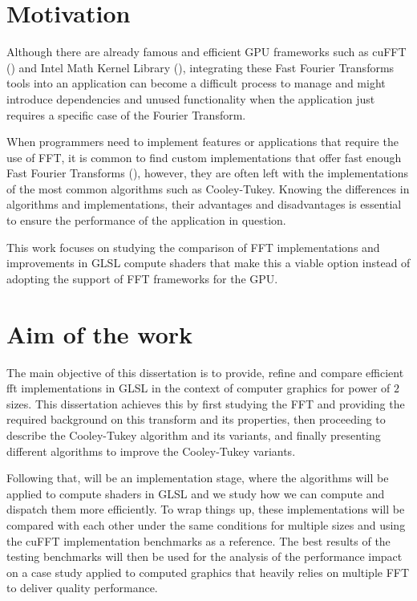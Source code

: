 \documentclass[
  oneside,
  11pt, a4paper,
  footinclude=true,
  headinclude=true,
  cleardoublepage=empty
]{scrbook}
\begin{document}
\section{Motivation} \label{sec:motivation}

Although there are already famous and efficient GPU frameworks such as cuFFT (\cite{nvidiacufft}) and Intel Math Kernel Library (\cite{wang2014intel}), integrating these Fast Fourier Transforms tools into an application can become a difficult process to manage and might introduce dependencies and unused functionality when the application just requires a specific case of the Fourier Transform.

When programmers need to implement features or applications that require the use of FFT, it is common to find custom implementations that offer fast enough Fast Fourier Transforms (\cite{flugge2017realtime}), however, they are often left with the implementations of the most common algorithms such as Cooley-Tukey. Knowing the differences in algorithms and implementations, their advantages and disadvantages is essential to ensure the performance of the application in question.

This work focuses on studying the comparison of FFT implementations and improvements in GLSL compute shaders that make this a viable option instead of adopting the support of FFT frameworks for the GPU.

\section{Aim of the work} \label{sec:aim-of-the-work}

The main objective of this dissertation is to provide, refine and compare efficient \acrshort{fft} implementations in GLSL in the context of computer graphics for power of $2$ sizes. This dissertation achieves this by first studying the FFT and providing the required background on this transform and its properties, then proceeding to describe the Cooley-Tukey algorithm and its variants, and finally presenting different algorithms to improve the Cooley-Tukey variants.

Following that, will be an implementation stage, where the algorithms will be applied to compute shaders in GLSL and we study how we can compute and dispatch them more efficiently. To wrap things up, these implementations will be compared with each other under the same conditions for multiple sizes and using the cuFFT implementation benchmarks as a reference. The best results of the testing benchmarks will then be used for the analysis of the performance impact on a case study applied to computed graphics that heavily relies on multiple FFT to deliver quality performance.
\end{document}
